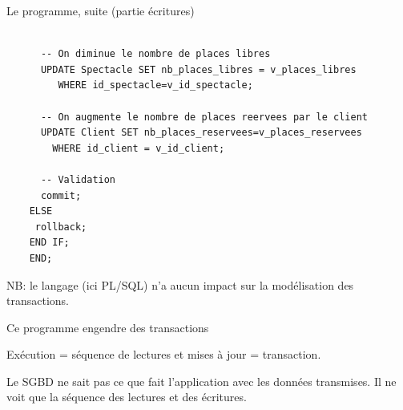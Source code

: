 \begin{frame}[fragile]{Le programme, suite (partie écritures)}


\begin{verbatim}
 
      -- On diminue le nombre de places libres
      UPDATE Spectacle SET nb_places_libres = v_places_libres 
         WHERE id_spectacle=v_id_spectacle;

      -- On augmente le nombre de places reervees par le client
      UPDATE Client SET nb_places_reservees=v_places_reservees
        WHERE id_client = v_id_client;

      -- Validation
      commit;
    ELSE
     rollback;
    END IF;
    END;
\end{verbatim}

\vfill
\begin{blocgauche}
NB: le langage (ici PL/SQL) \alert{n'a aucun impact} sur la modélisation des transactions.
\end{blocgauche}

\end{frame}


\begin{frame}{Ce programme engendre des \alert{transactions}}

\alert{Exécution} = séquence de  lectures et  mises à jour = \alert{transaction}.

\vfill



\vfill
\begin{blocgauche}
Le SGBD ne sait pas ce que fait l'application avec les données transmises. \alert{Il ne
voit que la séquence des lectures et des écritures.}
\end{blocgauche}

\end{frame}

